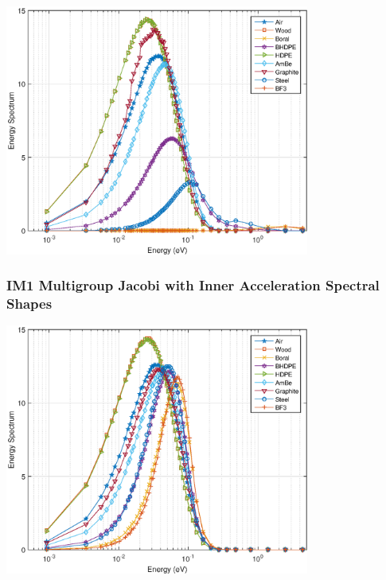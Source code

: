 \documentclass[compress,10pt]{beamer}
\begin{document}
\begin{frame}[t]
{\includegraphics[width=0.75\textwidth]{images/IM1_EC_Rich.eps}
}
{
\frametitle{IM1 Multigroup Jacobi with Inner Acceleration Spectral Shapes}
\hspace*{1.1cm}
\includegraphics[width=0.75\textwidth]{images/IM1_EC_MJIA.eps}
}
\end{frame}
\end{document}
